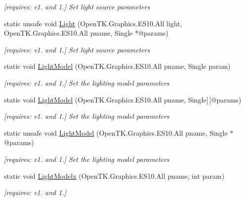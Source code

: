 \begin{DoxyCompactItemize}
\begin{DoxyCompactList}\small\item\em \mbox{[}requires\-: v1. and 1.\mbox{]} Set light source parameters \end{DoxyCompactList}\item 
static unsafe void \hyperlink{class_open_t_k_1_1_graphics_1_1_e_s10_1_1_g_l_ad85f879082921edf5bf8985c4e6f202d}{Light} (Open\-T\-K.\-Graphics.\-E\-S10.\-All light, Open\-T\-K.\-Graphics.\-E\-S10.\-All pname, Single $\ast$@params)
\begin{DoxyCompactList}\small\item\em \mbox{[}requires\-: v1. and 1.\mbox{]} Set light source parameters \end{DoxyCompactList}\item 
static void \hyperlink{class_open_t_k_1_1_graphics_1_1_e_s10_1_1_g_l_a5cfe02bbf80647a2fa811a5997d56461}{Light\-Model} (Open\-T\-K.\-Graphics.\-E\-S10.\-All pname, Single param)
\begin{DoxyCompactList}\small\item\em \mbox{[}requires\-: v1. and 1.\mbox{]} Set the lighting model parameters \end{DoxyCompactList}\item 
static void \hyperlink{class_open_t_k_1_1_graphics_1_1_e_s10_1_1_g_l_a9c073a31674392e3aec39e797a76d2e9}{Light\-Model} (Open\-T\-K.\-Graphics.\-E\-S10.\-All pname, Single\mbox{[}$\,$\mbox{]}@params)
\begin{DoxyCompactList}\small\item\em \mbox{[}requires\-: v1. and 1.\mbox{]} Set the lighting model parameters \end{DoxyCompactList}\item 
static unsafe void \hyperlink{class_open_t_k_1_1_graphics_1_1_e_s10_1_1_g_l_a4ee661b6fd9ce7304459920a901c6135}{Light\-Model} (Open\-T\-K.\-Graphics.\-E\-S10.\-All pname, Single $\ast$@params)
\begin{DoxyCompactList}\small\item\em \mbox{[}requires\-: v1. and 1.\mbox{]} Set the lighting model parameters \end{DoxyCompactList}\item 
static void \hyperlink{class_open_t_k_1_1_graphics_1_1_e_s10_1_1_g_l_afbdd374d422be37761f9afe53dbefc3c}{Light\-Modelx} (Open\-T\-K.\-Graphics.\-E\-S10.\-All pname, int param)
\begin{DoxyCompactList}\small\item\em \mbox{[}requires\-: v1. and 1.\mbox{]}\end{DoxyCompactList}\item 

\end{DoxyCompactItemize}
